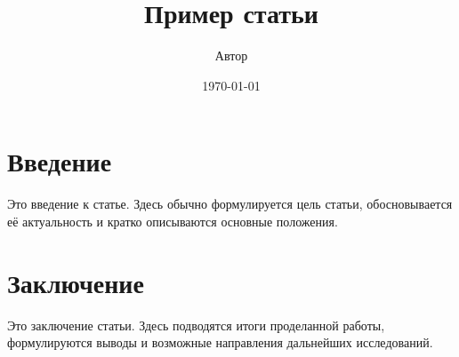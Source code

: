 \documentclass{article}
\title{Пример статьи}
\author{Автор}
\date{\today}
\begin{document}
\maketitle

\section{Введение}
Это введение к статье. Здесь обычно формулируется цель статьи, обосновывается её актуальность и кратко описываются основные положения.

\section{Заключение}
Это заключение статьи. Здесь подводятся итоги проделанной работы, формулируются выводы и возможные направления дальнейших исследований.
\end{document}
